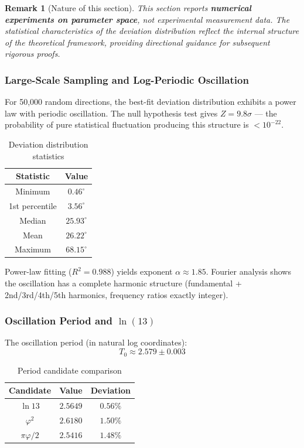\documentclass[12pt,a4paper,twocolumn]{article}
\renewcommand{\phi}{\varphi}
\newtheorem{remark}[theorem]{Remark}
\begin{document}
\begin{remark}[Nature of this section]
This section reports \textbf{numerical experiments on parameter space}, not experimental measurement data. The statistical characteristics of the deviation distribution reflect the internal structure of the theoretical framework, providing directional guidance for subsequent rigorous proofs.
\end{remark}

\subsubsection{Large-Scale Sampling and Log-Periodic Oscillation}

For 50,000 random directions, the best-fit deviation distribution exhibits a power law with periodic oscillation. The null hypothesis test gives $Z = 9.8\sigma$ --- the probability of pure statistical fluctuation producing this structure is $< 10^{-22}$.

\begin{table}[htbp]
\centering
\caption{Deviation distribution statistics}
\label{tab:deviation_stats_en}
\begin{tabular}{cc}
\hline
Statistic & Value \\
\hline
Minimum & $0.46^\circ$ \\
1st percentile & $3.56^\circ$ \\
Median & $25.93^\circ$ \\
Mean & $26.22^\circ$ \\
Maximum & $68.15^\circ$ \\
\hline
\end{tabular}
\end{table}

Power-law fitting ($R^2 = 0.988$) yields exponent $\alpha \approx 1.85$. Fourier analysis shows the oscillation has a complete harmonic structure (fundamental + 2nd/3rd/4th/5th harmonics, frequency ratios exactly integer).

\subsubsection{Oscillation Period and $\ln(13)$}

The oscillation period (in natural log coordinates):
\begin{equation}
T_0 \approx 2.579 \pm 0.003
\end{equation}

\begin{table}[htbp]
\centering
\caption{Period candidate comparison}
\label{tab:period_candidates_en}
\begin{tabular}{ccc}
\hline
Candidate & Value & Deviation \\
\hline
$\ln 13$ & $2.5649$ & $0.56\%$ \\
$\phi^2$ & $2.6180$ & $1.50\%$ \\
$\pi\phi/2$ & $2.5416$ & $1.48\%$ \\
\hline
\end{tabular}
\end{table}
\end{document}
